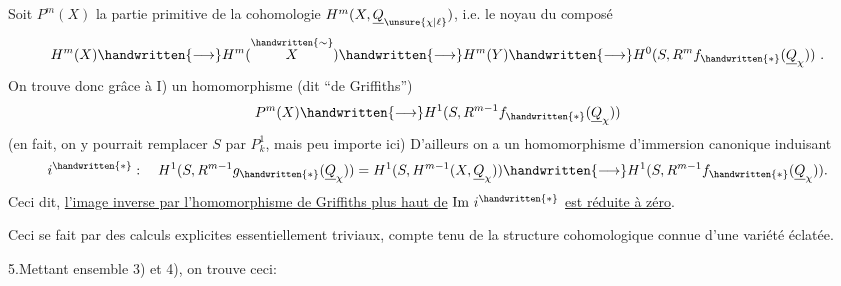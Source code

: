 Soit $P^m(X)$ la partie primitive de la cohomologie $H^m(X,\underline{Q}_{\unsure{\chi|\ell}})$, i.e. le noyau du composé
\[
H^m(X)\handwritten{\longrightarrow}H^m(\overset{\handwritten{\sim}}{X})\handwritten{\longrightarrow}H^m(Y)\handwritten{\longrightarrow}H^0(S,R^m f_{\handwritten{*}}(\underline{Q}_{\chi}))\ .
\]
On trouve donc grâce à I) un homomorphisme (dit ``de Griffiths'')
\[
P^m(X)\handwritten{\longrightarrow}H^1(S,R^{m-1}f_{\handwritten{*}}(\underline{Q}_{\chi}))
\]
(en fait, on y pourrait remplacer $S$ par $P^1_k$, mais  peu importe ici)
D'ailleurs  on a un homomorphisme d'immersion canonique
induisant
\[
i^{\handwritten{*}}:\quad H^1(S,R^{m-1}g_{\handwritten{*}}(\underline{Q}_{\chi}))=H^1(S,H^{m-1}(X,\underline{Q}_{\chi}))\handwritten{\longrightarrow}H^1(S,R^{m-1}f_{\handwritten{*}}(\underline{Q}_{\chi})).
\]
Ceci dit, \uline{l'image inverse par l'homomorphisme de Griffiths plus haut de} $\mathrm{Im}\ i^{\handwritten{*}}$ \uline{est réduite à zéro}.

Ceci se fait par des calculs explicites essentiellement triviaux, compte tenu de la structure cohomologique connue d'une variété éclatée.

5.\quad Mettant ensemble 3) et 4), on trouve ceci:

